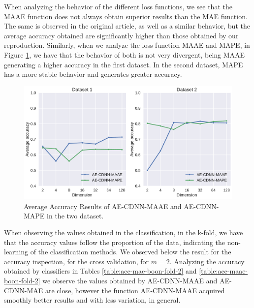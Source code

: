When analyzing the behavior of the different loss functions, we see that the MAAE function does not always obtain superior results than the MAE function. The same is observed in the original article, as well as a similar behavior, but the average accuracy obtained are significantly higher than those obtained by our reproduction. Similarly, when we analyze the loss function MAAE and MAPE, in Figure \ref{fig:average-maae-mape}, we have that the behavior of both is not very divergent, being MAAE generating a higher accuracy in the first dataset. In the second dataset, MAPE has a more stable behavior and generates greater accuracy. 


\begin{figure}[!ht]
\centering
\includegraphics[width=0.8\linewidth]{figure/average-MAAE-MAPE.pdf}
  \caption{Average Accuracy Results of AE-CDNN-MAAE and AE-CDNN-MAPE in the two dataset.}
\label{fig:average-maae-mape}
\end{figure}

When observing the values obtained in the classification, in the k-fold, we have that the accuracy values follow the proportion of the data, indicating the non-learning of the classification methods. We observed below the result for the accuracy inspection, for the cross validation, for $m = 2$. Analyzing the accuracy obtained by classifiers in Tables \ref{table:acc-mae-boon-fold-2} and \ref{table:acc-maae-boon-fold-2} we observe the values obtained by AE-CDNN-MAAE and AE-CDNN-MAE are close, however the function AE-CDNN-MAAE acquired smoothly better results and with less variation, in general. 


